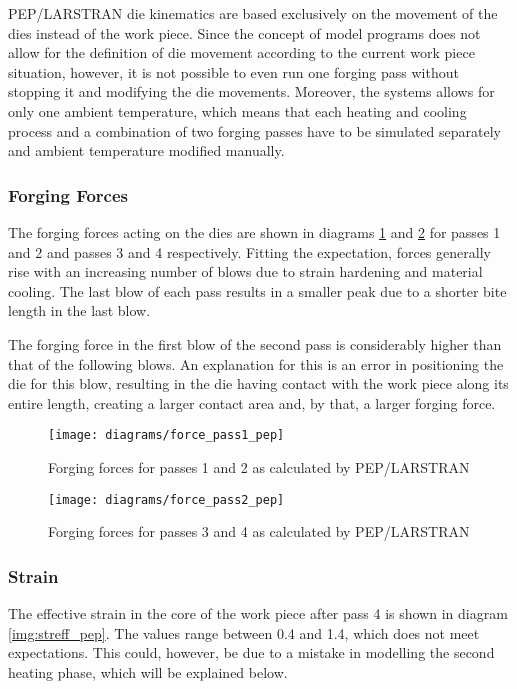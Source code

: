 PEP/LARSTRAN die kinematics are based exclusively on the movement of the dies instead of the work piece. Since the concept of model programs does not allow for the definition of die movement according to the current work piece situation, however, it is not possible to even run one forging pass without stopping it and modifying the die movements. Moreover, the systems allows for only one ambient temperature, which means that each heating and cooling process and a combination of two forging passes have to be simulated separately and ambient temperature modified manually.

\subsubsection{Forging Forces}

The forging forces acting on the dies are shown in diagrams \ref{img:forgforce_pep_p1} and \ref{img:forgforce_pep_p2} for passes 1 and 2 and passes 3 and 4 respectively. Fitting the expectation, forces generally rise with an increasing number of blows due to strain hardening and material cooling. The last blow of each pass results in a smaller peak due to a shorter bite length in the last blow.

The forging force in the first blow of the second pass is considerably higher than that of the following blows. An explanation for this is an error in positioning the die for this blow, resulting in the die having contact with the work piece along its entire length, creating a larger contact area and, by that, a larger forging force.

\begin{figure}[tb]
  \centering
  \texttt{[image: diagrams/force\_pass1\_pep]}
  \caption{Forging forces for passes 1 and 2 as calculated by PEP/LARSTRAN}
  \label{img:forgforce_pep_p1}
\end{figure}

\begin{figure}[tb]
  \centering
  \texttt{[image: diagrams/force\_pass2\_pep]}
  \caption{Forging forces for passes 3 and 4 as calculated by PEP/LARSTRAN}
  \label{img:forgforce_pep_p2}
\end{figure}


\subsubsection{Strain}

The effective strain in the core of the work piece after pass 4 is shown in diagram \ref{img:streff_pep}. The values range between 0.4 and 1.4, which does not meet expectations. This could, however, be due to a mistake in modelling the second heating phase, which will be explained below.

